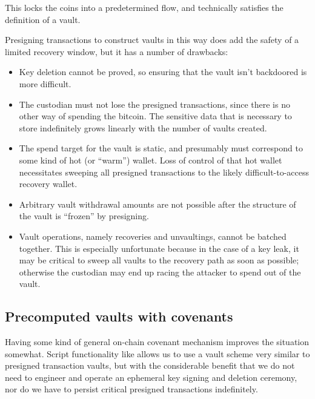 \documentclass[10pt]{article}
\begin{document}
This locks the coins into a predetermined flow, and technically satisfies the
definition of a vault.

Presigning transactions to construct vaults in this way does add the safety of a
limited recovery window, but it has a number of drawbacks:

\begin{itemize}

  \item Key deletion cannot be proved, so ensuring that the vault isn't
    backdoored is more difficult.

  \item The custodian must not lose the presigned transactions, since there is no other
    way of spending the bitcoin. The sensitive data that is necessary to store
    indefinitely grows linearly with the number of vaults created.

  \item The spend target for the vault is static, and presumably must correspond to
    some kind of hot (or ``warm'') wallet. Loss of control of that hot wallet
    necessitates sweeping all presigned transactions to the likely difficult-to-access
    recovery wallet.

  \item Arbitrary vault withdrawal amounts are not possible after the structure of the
    vault is ``frozen'' by presigning.

  \item Vault operations, namely recoveries and unvaultings, cannot be batched together. This is
    especially unfortunate because in the case of a key leak, it may be
    critical to sweep all vaults to the recovery path as soon as possible; otherwise the
    custodian may end up racing the attacker to spend out of the vault.

\end{itemize}


\subsection*{Precomputed vaults with covenants}

Having some kind of general on-chain covenant mechanism improves the situation
somewhat. Script functionality like \ctv{} \cite{CTV} allows us to use a vault
scheme very similar to presigned transaction vaults, but with the considerable benefit
that we do not need to engineer and operate an ephemeral key signing and deletion
ceremony, nor do we have to persist critical presigned transactions indefinitely.
\end{document}
